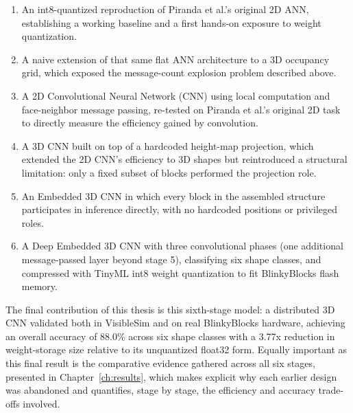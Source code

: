 \documentclass[12pt,a4paper]{report}
\begin{document}
\begin{enumerate}
    \item An int8-quantized reproduction of Piranda et al.'s original 2D ANN, establishing a working baseline and a first hands-on exposure to weight quantization.
    \item A naive extension of that same flat ANN architecture to a 3D occupancy grid, which exposed the message-count explosion problem described above.
    \item A 2D Convolutional Neural Network (CNN) using local computation and face-neighbor message passing, re-tested on Piranda et al.'s original 2D task to directly measure the efficiency gained by convolution.
    \item A 3D CNN built on top of a hardcoded height-map projection, which extended the 2D CNN's efficiency to 3D shapes but reintroduced a structural limitation: only a fixed subset of blocks performed the projection role.
    \item An Embedded 3D CNN in which every block in the assembled structure participates in inference directly, with no hardcoded positions or privileged roles.
    \item A Deep Embedded 3D CNN with three convolutional phases (one additional message-passed layer beyond stage 5), classifying six shape classes, and compressed with TinyML int8 weight quantization to fit BlinkyBlocks flash memory.
\end{enumerate}

The final contribution of this thesis is this sixth-stage model: a distributed 3D CNN validated both in VisibleSim and on real BlinkyBlocks hardware, achieving an overall accuracy of 88.0\% across six shape classes with a 3.77x reduction in weight-storage size relative to its unquantized float32 form. Equally important as this final result is the comparative evidence gathered across all six stages, presented in Chapter~\ref{ch:results}, which makes explicit why each earlier design was abandoned and quantifies, stage by stage, the efficiency and accuracy trade-offs involved.
\end{document}
